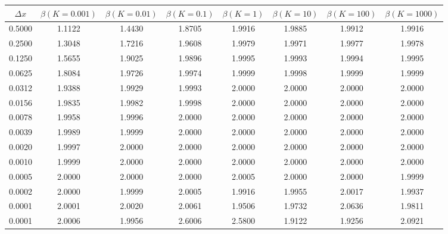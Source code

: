\begin{tabular}{|c|c|c|c|c|c|c|c|}
\hline
\textbf{$\Delta x$}&\textbf{$\beta(K=0.001)$}&\textbf{$\beta(K=0.01)$}&\textbf{$\beta(K=0.1)$}&\textbf{$\beta(K=1)$}&\textbf{$\beta(K=10)$}&\textbf{$\beta(K=100)$}&\textbf{$\beta(K=1000)$}\\\hline
0.5000&1.1122&1.4430&1.8705&1.9916&1.9885&1.9912&1.9916\\\hline
0.2500&1.3048&1.7216&1.9608&1.9979&1.9971&1.9977&1.9978\\\hline
0.1250&1.5655&1.9025&1.9896&1.9995&1.9993&1.9994&1.9995\\\hline
0.0625&1.8084&1.9726&1.9974&1.9999&1.9998&1.9999&1.9999\\\hline
0.0312&1.9388&1.9929&1.9993&2.0000&2.0000&2.0000&2.0000\\\hline
0.0156&1.9835&1.9982&1.9998&2.0000&2.0000&2.0000&2.0000\\\hline
0.0078&1.9958&1.9996&2.0000&2.0000&2.0000&2.0000&2.0000\\\hline
0.0039&1.9989&1.9999&2.0000&2.0000&2.0000&2.0000&2.0000\\\hline
0.0020&1.9997&2.0000&2.0000&2.0000&2.0000&2.0000&2.0000\\\hline
0.0010&1.9999&2.0000&2.0000&2.0000&2.0000&2.0000&2.0000\\\hline
0.0005&2.0000&2.0000&2.0000&2.0005&2.0000&2.0000&1.9999\\\hline
0.0002&2.0000&1.9999&2.0005&1.9916&1.9955&2.0017&1.9937\\\hline
0.0001&2.0001&2.0020&2.0061&1.9506&1.9732&2.0636&1.9811\\\hline
0.0001&2.0006&1.9956&2.6006&2.5800&1.9122&1.9256&2.0921\\\hline
\end{tabular}

